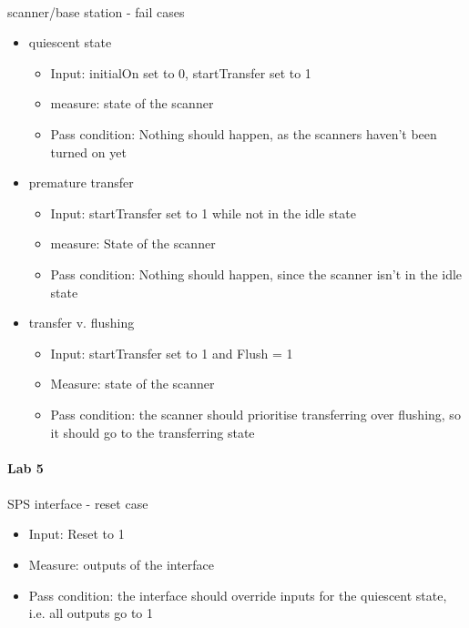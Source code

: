 \documentclass{article}
\begin{document}
    \paragraph{} scanner/base station - fail cases
    \begin{itemize}
      \item quiescent state
      \begin{itemize}
        \item Input: initialOn set to 0, startTransfer set to 1
        \item measure: state of the scanner
        \item Pass condition: Nothing should happen, as the scanners haven’t been turned on yet
      \end{itemize}

      \item premature transfer
      \begin{itemize}
        \item Input: startTransfer set to 1 while not in the idle state
        \item measure: State of the scanner
        \item Pass condition: Nothing should happen, since the scanner isn’t in the idle state
      \end{itemize}

      \item transfer v. flushing
      \begin{itemize}
        \item Input: startTransfer set to 1 and Flush = 1
        \item Measure: state of the scanner
        \item Pass condition: the scanner should prioritise transferring over flushing, so it should go to the transferring state
      \end{itemize}
    \end{itemize}

    \paragraph{Lab 5}
    \paragraph{} SPS interface - reset case
    \begin{itemize}
      \item Input: Reset to 1
      \item Measure: outputs of the interface
      \item Pass condition: the interface should override inputs for the quiescent state, i.e. all outputs go to 1
    \end{itemize}
\end{document}
